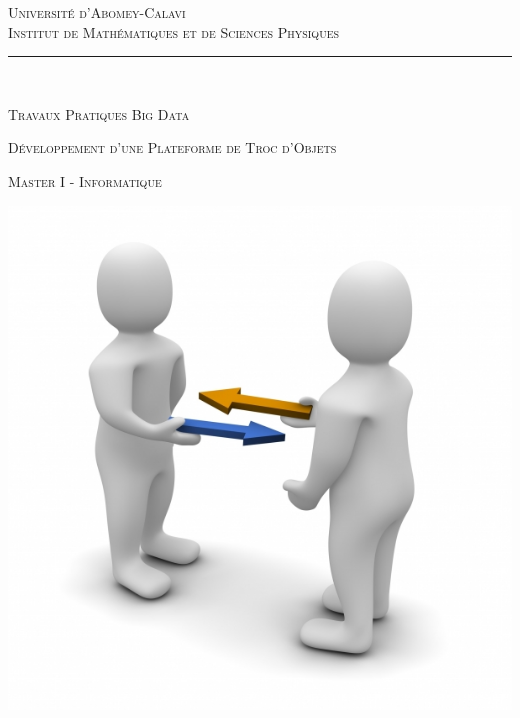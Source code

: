 \documentclass[12pt]{report}
\renewcommand\contentsname{\bf \Large \sc Table des Matières}
\begin{document}
	\thispagestyle{empty}
	\begin{center}
		\textsc{\large Université d'Abomey-Calavi}             							  		\\ \vspace{3em}  %
		\textsc{\Large Institut de Mathématiques et de Sciences Physiques}                   	\\ \vspace{2em}
		
		
		\rule{0.90\textwidth}{1.67pt}																\\ \vspace{1.2em}

		\textsc{\large Travaux Pratiques Big Data} 	
		
							  		
		\vspace{3em}			
		\textsc{\Large Développement d'une Plateforme de Troc d'Objets} 	\\ 
		
		\vspace{2em}
	
		\textsc{Master I - Informatique}
		
			\begin{center}
				\includegraphics[scale=0.35]{troc4}
				\label{Visual Studio Code}
			\end{center}


\end{center}
\end{document}
